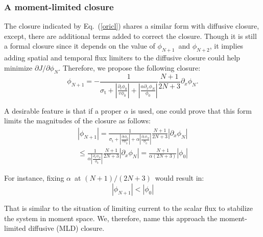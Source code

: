 \documentclass[review]{elsarticle}
\newcommand{\ppz}{\partial_x}%
\newcommand{\psii}[1]{\phi_\ensuremath{{#1}}}
\begin{document}
\subsubsection{A moment-limited closure}
The closure indicated by Eq.~(\ref{oricl}) shares a similar form with diffusive closure, except, there are additional terms added to correct the closure. Though it is still a formal closure since it depends on the value of $\psii{N+1}$\ and $\psii{N+2}$, it implies adding spatial and temporal flux limiters to the diffusive closure could help minimize $\partial J/\partial\psii{N}$. Therefore, we propose the following closure:
\begin{equation}\label{ml}
\psii{N+1}=-\frac{1}{\sigma_\mathrm{t}+\displaystyle\left|\frac{\partial_t\psii{0}}{v\psii{0}}\right|+\left|\frac{\alpha\partial_x\psii{N}}{\psii{0}}\right|}\frac{N+1}{2N+3}\ppz\psii{N}.
\end{equation}

%
A desirable feature is that if a proper $\alpha$ is used, one could prove that this form limits the magnitudes of the closure as follows:
\begin{align}
|\phi_{N+1}|=\frac{1}{\sigma_\mathrm{t}+\displaystyle\left|\frac{\partial_t\psii{0}}{v\psii{0}}\right|+\alpha\left|\frac{\partial_x\psii{N}}{\psii{0}}\right|}\frac{N+1}{2N+3}\left|\ppz\psii{N}\right|\\\nonumber
\leq \frac{1}{\displaystyle\alpha\left|\frac{\partial_x\psii{N}}{\psii{0}}\right|}\frac{N+1}{2N+3}\left|\ppz\psii{N}\right|=\frac{N+1}{\alpha(2N+3)}|\phi_0|
\end{align}

For instance, fixing $\alpha$~at $(N+1)/(2N+3)$~would result in:
\begin{equation}
|\psii{N+1}|<|\psii{0}|
\end{equation}

That is similar to the situation of limiting current to the scalar flux to stabilize the system in moment space. We, therefore, name this approach the moment-limited diffusive (MLD) closure. 
\end{document}
